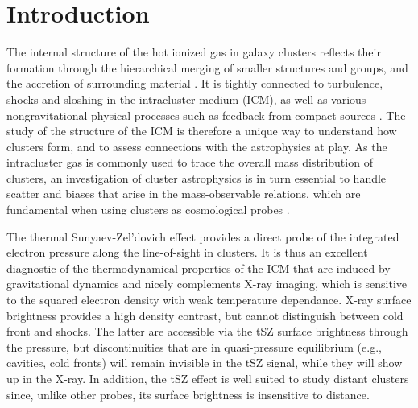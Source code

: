 \documentclass[traditabstract]{aa}
\begin{document}
\section{Introduction}
The internal structure of the hot ionized gas in galaxy clusters reflects their formation through the hierarchical merging of smaller structures and groups, and the accretion of surrounding material \citep[e.g.,][and references therein]{Kravtsov2012}. It is tightly connected to turbulence, shocks and sloshing \citep[e.g.,][]{Markevitch2007} in the intracluster medium (ICM), as well as various nongravitational physical processes such as feedback from compact sources \citep[e.g.,][]{Fabian2012}. The study of the structure of the ICM is therefore a unique way to understand how clusters form, and to assess connections with the astrophysics at play. As the intracluster gas is commonly used to trace the overall mass distribution of clusters, an investigation of cluster astrophysics is in turn essential to handle scatter and biases that arise in the mass-observable relations, which are fundamental when using clusters as cosmological probes \citep[see, e.g.,][for a review]{Allen2011}.

The thermal Sunyaev-Zel'dovich \citep[tSZ,][]{Sunyaev1972} effect provides a direct probe of the integrated electron pressure along the line-of-sight in clusters. It is thus an excellent diagnostic of the thermodynamical properties of the ICM that are induced by gravitational dynamics and nicely complements X-ray imaging, which is sensitive to the squared electron density with weak temperature dependance. X-ray surface brightness provides a high density contrast, but cannot distinguish between cold front and shocks. The latter are accessible via the tSZ surface brightness through the pressure, but discontinuities that are in quasi-pressure equilibrium (e.g., cavities, cold fronts) will remain invisible in the tSZ signal, while they will show up in the X-ray. In addition, the tSZ effect is well suited to study distant clusters since, unlike other probes, its surface brightness is insensitive to distance.
\end{document}
